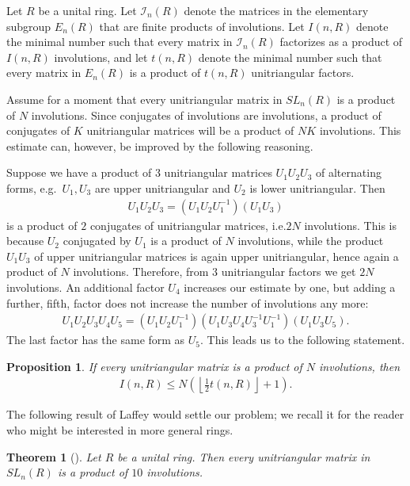 \documentclass{amsart}
\newtheorem{Thm}{Theorem}[section]
\newtheorem{proposition}[theorem]{Proposition}
\theoremstyle{definition}
\begin{document}
Let $R$ be a unital ring. Let $\mathcal{I}_n(R)$ denote the matrices in the elementary subgroup $E_n (R)$ that are finite products of involutions. Let $I(n,R)$ denote the minimal number such that every matrix in $\mathcal{I}_n(R)$ factorizes as a product of $I(n,R)$ involutions, and let $t(n,R)$ denote the minimal number such that every matrix in $E_n (R)$ is a product of $t(n,R)$ unitriangular factors.

Assume for a moment that every unitriangular matrix in $SL_n(R)$ is a product of $N$ involutions.
Since conjugates of involutions are involutions, a product of conjugates of $K$ unitriangular matrices will be a product of $NK$ involutions. This estimate can, however, be improved by the following reasoning.

Suppose we have a product of $3$ unitriangular matrices $U_1 U_2 U_3$ of alternating forms, e.g.\ $U_1, U_3$ are upper unitriangular and $U_2$ is lower unitriangular. Then 
\begin{align*}
    U_1 U_2 U_3 = (U_1 U_2 U_1^{-1}) (U_1 U_3) 
\end{align*}
is a product of $2$ conjugates of unitriangular matrices, i.e.\@ $2N$ involutions. This is because $U_2$ conjugated by $U_1$ is a product of $N$ involutions, while the product $U_1 U_3$ of upper unitriangular matrices is again upper unitriangular, hence again a product of $N$ involutions. Therefore, from $3$ unitriangular factors we get $2N$ involutions. An additional factor $U_4$ increases our estimate by one, but adding a further, fifth, factor does not increase the number of involutions any more:
\begin{align*}
    U_1 U_2 U_3 U_4 U_5 = (U_1 U_2 U_1^{-1}) (U_1 U_3 U_4 U_3^{-1} U_1^{-1}) ( U_1 U_3 U_5 ). 
\end{align*}
The last factor has the same form as $U_5$. This leads us to the following statement. 
\begin{proposition} \label{proposition:e-t-estimate} 
    If every unitriangular matrix is a product of $N$ involutions, then
    \begin{align*} 
    I(n, R)  \leq N \left(\left\lfloor \frac{1}{2} t(n,R) \right\rfloor + 1\right).
    \end{align*}
\end{proposition}


The following result of Laffey would settle our problem; we recall it for the reader who might be interested in more general rings.
\begin{Thm} [\cite{MR1635020}] \label{Laffey}
 Let $R$ be a unital ring. Then every unitriangular matrix in $SL_n (R)$ is a product of $10$ involutions.
\end{Thm}
\end{document}
